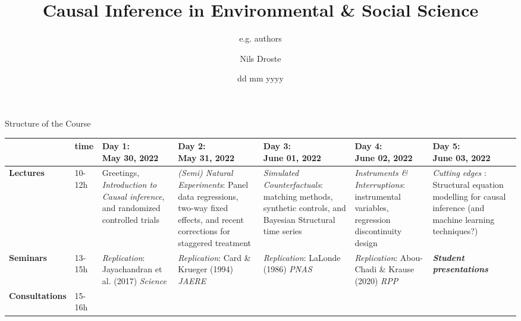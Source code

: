 \documentclass[aspectratio=169]{beamer}
\title[Causal Inference]{Causal Inference in Environmental \& \newline Social Science }
\author{Nils Droste}
\subtitle{e.g. authors}
\date{dd mm yyyy}
\institute{Lund University\\Department for Political Science}
\begin{document}

\titleframe



	\begin{frame}{Structure of the Course}
		\begin{table} \tiny
			\begin{tabular}{|p{1.25cm}|p{.75cm}|p{1.3cm}|p{1.3cm}|p{1.3cm}|p{1.3cm}|p{1.3cm}|}
				\hline

					& \textbf{time}
					&	\thead{ \textbf{Day 1:} \\  May 30, 2022}
					& \thead{ \textbf{Day 2:} \\  May 31, 2022}
					& \thead{ \textbf{Day 3:} \\  June 01, 2022}
					& \thead{ \textbf{Day 4:} \\  June 02, 2022}
					& \thead{ \textbf{Day 5:} \\  June 03, 2022}
					\\
				\hline
					\textbf{Lectures}
					& 10-12h
					& Greetings, \textit{Introduction to Causal inference}, and randomized controlled trials
					& \textit{(Semi) Natural Experiments}: Panel data regressions, two-way fixed effects, and recent corrections for staggered treatment
					& \textit{Simulated Counterfactuals}: matching methods, synthetic controls, and Bayesian Structural time series
					& \textit{Instruments \& Interruptions}: instrumental variables, regression discontinuity design
					& \textit{Cutting edges} : Structural equation modelling for causal inference (and machine learning techniques?)
					\\
				\hline
				 	\textbf{Seminars}
					& 13-15h
					& \textit{Replication}: Jayachandran et al. (2017) \textit{Science}
					& \textit{Replication}: Card \& Krueger (1994) \textit{JAERE}
					& \textit{Replication}: LaLonde (1986) \textit{PNAS}
					& \textit{Replication}: Abou-Chadi \& Krause (2020) \textit{RPP}
					& \textit{\textbf{Student presentations}}
					\\
				\hline
					\textbf{Consultations}
					& 15-16h
					& \thead{ \\ }
					& \thead{ \\ }
					& \thead{ \\ }
					& \thead{ \\ }
					& \thead{ \\ }
					\\
				\hline
			\end{tabular}
		\end{table}
	\end{frame}
\end{document}
